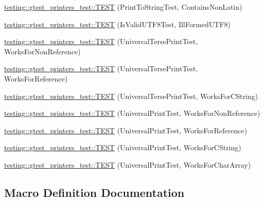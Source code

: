\begin{DoxyCompactItemize}
\item 
\mbox{\hyperlink{namespacetesting_1_1gtest__printers__test_aa313c2e91ba3b712501d6e7f393a592a}{testing\+::gtest\+\_\+printers\+\_\+test\+::\+T\+E\+ST}} (Print\+To\+String\+Test, Contains\+Non\+Latin)
\item 
\mbox{\hyperlink{namespacetesting_1_1gtest__printers__test_a5d5349c44a2f23e585ea503cff88056e}{testing\+::gtest\+\_\+printers\+\_\+test\+::\+T\+E\+ST}} (Is\+Valid\+U\+T\+F8\+Test, Ill\+Formed\+U\+T\+F8)
\item 
\mbox{\hyperlink{namespacetesting_1_1gtest__printers__test_ab49ff6527b0b01411b725fe46e1af65c}{testing\+::gtest\+\_\+printers\+\_\+test\+::\+T\+E\+ST}} (Universal\+Terse\+Print\+Test, Works\+For\+Non\+Reference)
\item 
\mbox{\hyperlink{namespacetesting_1_1gtest__printers__test_ab7adb58a0e08e0830157a5a1c7bceac5}{testing\+::gtest\+\_\+printers\+\_\+test\+::\+T\+E\+ST}} (Universal\+Terse\+Print\+Test, Works\+For\+Reference)
\item 
\mbox{\hyperlink{namespacetesting_1_1gtest__printers__test_ab11252e228a240a349d747546bc222d2}{testing\+::gtest\+\_\+printers\+\_\+test\+::\+T\+E\+ST}} (Universal\+Terse\+Print\+Test, Works\+For\+C\+String)
\item 
\mbox{\hyperlink{namespacetesting_1_1gtest__printers__test_a43d4efc91c2ea7d8220891df9b0437df}{testing\+::gtest\+\_\+printers\+\_\+test\+::\+T\+E\+ST}} (Universal\+Print\+Test, Works\+For\+Non\+Reference)
\item 
\mbox{\hyperlink{namespacetesting_1_1gtest__printers__test_a58ad7c81884e852b09646764ce14a47e}{testing\+::gtest\+\_\+printers\+\_\+test\+::\+T\+E\+ST}} (Universal\+Print\+Test, Works\+For\+Reference)
\item 
\mbox{\hyperlink{namespacetesting_1_1gtest__printers__test_ac20aca012aca1ca9589dbf7483fbbbd1}{testing\+::gtest\+\_\+printers\+\_\+test\+::\+T\+E\+ST}} (Universal\+Print\+Test, Works\+For\+C\+String)
\item 
\mbox{\hyperlink{namespacetesting_1_1gtest__printers__test_a23a9eda97679bfc29c87b8de17cc35bf}{testing\+::gtest\+\_\+printers\+\_\+test\+::\+T\+E\+ST}} (Universal\+Print\+Test, Works\+For\+Char\+Array)
\end{DoxyCompactItemize}


\subsection{Macro Definition Documentation}
\mbox{\label{googletest-printers-test_8cc_aa0ed482a6777cce04eecd24c530c78ec}} 
